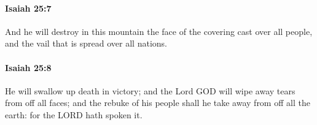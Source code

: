 		\paragraph{Isaiah 25:7} %
			\label{ISAIAH-25-7}

			And he will destroy in this mountain the face of the covering cast over all people, and the vail that is spread over all nations.


		\paragraph{Isaiah 25:8} %
			\label{ISAIAH-25-8}

			He will swallow up death in victory; and the Lord GOD will wipe away tears from off all faces; and the rebuke of his people shall he take away from off all the earth: for the LORD hath spoken it.


